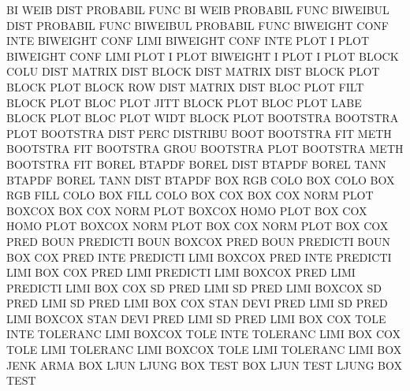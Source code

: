 BI       WEIB DIST                      PROBABIL FUNC
BI       WEIB                           PROBABIL FUNC
BIWEIBUL DIST                           PROBABIL FUNC
BIWEIBUL                                PROBABIL FUNC
BIWEIGHT CONF INTE                      BIWEIGHT CONF LIMI
BIWEIGHT CONF INTE PLOT                 I        PLOT
BIWEIGHT CONF LIMI PLOT                 I        PLOT
BIWEIGHT I    PLOT                      I        PLOT
BLOCK    COLU DIST                      MATRIX   DIST
BLOCK    DIST                           MATRIX   DIST
BLOCK    PLOT                           BLOCK    PLOT
BLOCK    ROW  DIST                      MATRIX   DIST
BLOC     PLOT FILT                      BLOCK    PLOT
BLOC     PLOT JITT                      BLOCK    PLOT
BLOC     PLOT LABE                      BLOCK    PLOT
BLOC     PLOT WIDT                      BLOCK    PLOT
BOOTSTRA                                BOOTSTRA PLOT
BOOTSTRA DIST PERC                      DISTRIBU BOOT
BOOTSTRA FIT  METH                      BOOTSTRA FIT
BOOTSTRA GROU                           BOOTSTRA PLOT
BOOTSTRA METH                           BOOTSTRA FIT
BOREL                                   BTAPDF
BOREL    DIST                           BTAPDF
BOREL    TANN                           BTAPDF
BOREL    TANN DIST                      BTAPDF
BOX      RGB  COLO                      BOX      COLO
BOX      RGB  FILL COLO                 BOX      FILL COLO
BOX      COX                            BOX      COX  NORM PLOT
BOXCOX                                  BOX      COX  NORM PLOT
BOXCOX   HOMO PLOT                      BOX      COX  HOMO PLOT
BOXCOX   NORM PLOT                      BOX      COX  NORM PLOT
BOX      COX  PRED BOUN                 PREDICTI BOUN
BOXCOX   PRED BOUN                      PREDICTI BOUN
BOX      COX  PRED INTE                 PREDICTI LIMI
BOXCOX   PRED INTE                      PREDICTI LIMI
BOX      COX  PRED LIMI                 PREDICTI LIMI
BOXCOX   PRED LIMI                      PREDICTI LIMI
BOX      COX  SD   PRED LIMI            SD       PRED LIMI
BOXCOX   SD   PRED LIMI                 SD       PRED LIMI
BOX      COX  STAN DEVI PRED LIMI       SD       PRED LIMI
BOXCOX   STAN DEVI PRED LIMI            SD       PRED LIMI
BOX      COX  TOLE INTE                 TOLERANC LIMI
BOXCOX   TOLE INTE                      TOLERANC LIMI
BOX      COX  TOLE LIMI                 TOLERANC LIMI
BOXCOX   TOLE LIMI                      TOLERANC LIMI
BOX      JENK                           ARMA
BOX      LJUN                           LJUNG    BOX  TEST
BOX      LJUN TEST                      LJUNG    BOX  TEST
